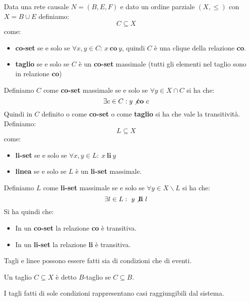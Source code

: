 \begin{definizione}
    Data una rete causale $N = (B,E, F)$ e dato un ordine parziale $(X, \leq)$ con $X = B \cup E$ definiamo:
    \begin{equation}
        C \subseteq X
    \end{equation}
    come:
    \begin{itemize}
        \item \textbf{co-set} se e solo se $\forall x, y \in C$: $x \ \textbf{co} \ y$, quindi $C$ è una clique della relazione \textbf{co}.
        \item \textbf{taglio} se e solo se $C$ è un \textbf{co-set} massimale (tutti gli elementi nel taglio sono in relazione \textbf{co})
    \end{itemize}
    Definiamo $C$ come \textbf{co-set} massimale se e solo se $\forall y \in X \cap C$ si ha che:
    \begin{equation}
        \exists c \in C: y \not\textbf{co} \ c
    \end{equation}
    Quindi in $C$ definito o come \textbf{co-set} o come \textbf{taglio} si ha che vale la transitività. Definiamo:
    \begin{equation}
        L \subseteq X
    \end{equation}
    come:
    \begin{itemize}
        \item \textbf{li-set} se e solo se $\forall x, y \in L: \ x \ \textbf{li} \ y$
        \item \textbf{linea} se e solo se $L$ è un \textbf{li-set} massimale.
    \end{itemize}
    Definiamo $L$ come \textbf{li-set} massimale se e solo se $\forall y \in X \backslash L$ si ha che:
    \begin{equation}
        \exists l \in L: \ y \not\textbf{li}  \ l
    \end{equation}
    Si ha quindi che:
    \begin{itemize}
        \item In un \textbf{co-set} la relazione \textbf{co} è transitiva.
        \item In un \textbf{li-set} la relazione \textbf{li} è transitiva.
    \end{itemize}
    Tagli e linee possono essere fatti sia di condizioni che di eventi.
\end{definizione}
Un taglio $C \subseteq X$ è detto $B$-taglio se $C \subseteq B$.

I tagli fatti di sole condizioni rappresentano casi raggiungibili dal sistema.

